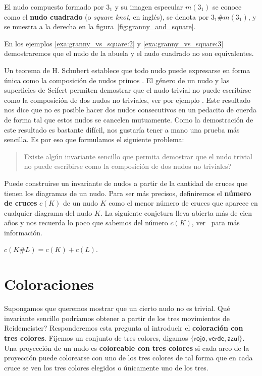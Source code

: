 \documentclass[graybox]{svmult}
\begin{document}
\begin{example}
    El nudo compuesto formado por $3_1$ y su imagen especular $m(3_1)$ se conoce
    como el \textbf{nudo cuadrado} (o \emph{square knot}, en inglés), se denota
    por $3_1\#m(3_1)$, y se muestra a la derecha en la
    figura~\ref{fig:granny_and_square}. 
\end{example}
    
En los ejemplos \ref{exa:granny_vs_square:2} y \ref{exa:granny_vs_square:3}
demostraremos que el nudo de la abuela y el nudo cuadrado no son equivalentes.

Un teorema de H. Schubert establece que todo nudo puede expresarse en forma
única como la composición de nudos primos \cite[VII]{MR3156509}.  El género de
un nudo y las superficies de Seifert permiten demostrar que el nudo trivial no
puede escribirse como la composición de dos nudos no triviales, ver por ejemplo
\cite[\S4.3]{MR2079925}. Este resultado nos dice que no es posible hacer dos
nudos consecutivos en un pedacito de cuerda de forma tal que estos nudos se
cancelen mutuamente.  Como la demostración de este resultado es bastante
difícil, nos gustaría tener a mano una prueba más sencilla. Es por eso que
formulamos el siguiente problema:
\begin{quote}
	\textquestiondown Existe algún invariante sencillo que permita
	demostrar que el nudo trivial no puede escribirse como la composición
	de dos nudos no triviales? 
\end{quote}

Puede construirse un invariante de nudos a partir de la cantidad de cruces que
tienen los diagramas de un nudo.  Para ser más precisos, definiremos el
\textbf{número de cruces} $c(K)$ de un nudo $K$ como el menor número de cruces
que aparece en cualquier diagrama del nudo $K$. La siguiente conjetura lleva
abierta más de cien años y nos recuerda lo poco que sabemos del número $c(K)$,
ver~\cite[\S 3.3]{MR2079925} para más información.

\begin{conjecture}
	$c(K\#L)=c(K)+c(L)$. 
\end{conjecture}

\section{Coloraciones}
\label{section:coloreos}

 \label{block:3coloring}
 Supongamos que queremos mostrar que un cierto nudo no es trivial. \textquestiondown Qué
 invariante sencillo podríamos obtener a partir de los tres movimientos de
 Reidemeister? Responderemos esta pregunta al introducir el \textbf{coloración 
 con tres colores}. Fijemos un conjunto de tres colores,
 digamos $\{\textsf{rojo},\textsf{verde},\textsf{azul}\}$.  Una proyección
 de un nudo es \textbf{coloreable con tres colores} si cada arco de la
 proyección puede colorearse con uno de los tres colores de tal forma que en
 cada cruce se ven los tres colores elegidos o únicamente uno de los tres. 
\end{document}
